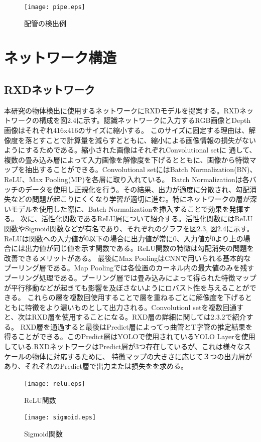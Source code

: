 \begin{figure}[htbt]
	\centering
	 \texttt{[image: pipe.eps]}
	 \caption{配管の検出例}
	 \label{fig:f2}
\end{figure}


\section{ネットワーク構造}
\subsection{RXDネットワーク}

本研究の物体検出に使用するネットワークにRXDモデルを提案する。RXDネットワークの構成を図2.4に示す。認識ネットワークに入力するRGB画像とDepth画像はそれぞれ416x416のサイズに縮小する。
このサイズに固定する理由は、解像度を落とすことで計算量を減らすとともに、縮小による画像情報の損失がないようにするためである。縮小された画像はそれぞれConvolutional setに
通して、複数の畳み込み層によって入力画像を解像度を下げるとともに、画像から特徴マップを抽出することができる。Convolutional setにはBatch Normalization(BN)、ReLU、Max Pooling(MP)を各層に取り入れている。
Batch Normalizationは各バッチのデータを使用し正規化を行う。その結果、出力が適度に分散され、勾配消失などの問題が起こりにくくなり学習が適切に進む。特にネットワークの層が深いモデルを使用した際に、Batch Normalizationを挿入することで効果を発揮する。
次に、活性化関数であるReLU層について紹介する。活性化関数にはReLU関数やSigmoid関数などが有名であり、それぞれのグラフを図2.3, 図2.4に示す。ReLUは関数への入力値が0以下の場合に出力値が常に0、入力値が0より上の場合には出力値が同じ値を示す関数である。ReLU関数の特徴は勾配消失の問題を改善できるメリットがある。
最後にMax PoolingはCNNで用いられる基本的なプーリング層である。Map Poolingでは各位置のカーネル内の最大値のみを残すプーリング処理である。プーリング層では畳み込みによって得られた特徴マップが平行移動などが起きても影響を及ぼさないようにロバスト性を与えることができる。
これらの層を複数回使用することで層を重ねるごとに解像度を下げるとともに特徴をより濃いものとして出力される。Convolutionl setを複数回通すと、次はRXD層を使用することになる。RXD層の詳細に関しては2.3.2で紹介する。
RXD層を通過すると最後はPredict層によってっ曲管とT字管の推定結果を得ることができる。このPredict層はYOLOで使用されているYOLO Layerを使用している.RXDネットワークはPredict層が3つ存在しているが、これは様々なスケールの物体に対応するために、
特徴マップの大きさに応じて３つの出力層があり、それぞれのPredict層で出力または損失をを求める。

\begin{figure}[htbp]
  \begin{minipage}[b]{0.45\linewidth}
    \centering
    \texttt{[image: relu.eps]}
    \caption{ReLU関数}
  \end{minipage}
  \begin{minipage}[b]{0.45\linewidth}
    \centering
    \texttt{[image: sigmoid.eps]}
    \caption{Sigmoid関数}
  \end{minipage}
\end{figure}

